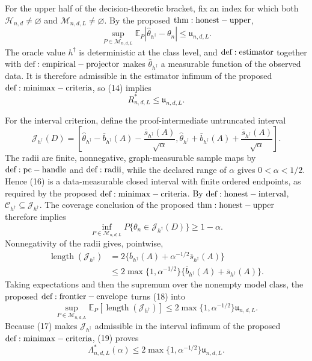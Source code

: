 For the upper half of the decision-theoretic bracket, fix an index for which both \(\mathcal H_{n,d}\ne\varnothing\) and \(\mathcal M_{n,d,L}\ne\varnothing\).  By the proposed \({\rm thm:honest-upper}\),
\[
 \sup_{P\in\mathcal M_{n,d,L}}
 \mathbb E_P|\widehat\theta_{h^\dagger}-\theta_n|
 \leq\mathfrak u_{n,d,L}.
\tag{14}
\]
The oracle value \(h^\dagger\) is deterministic at the class level, and \({\rm def:estimator}\) together with \({\rm def:empirical-projector}\) makes \(\widehat\theta_{h^\dagger}\) a measurable function of the observed data.  It is therefore admissible in the estimator infimum of the proposed \({\rm def:minimax-criteria}\), so (14) implies
\[
 R^*_{n,d,L}\leq\mathfrak u_{n,d,L}.
\tag{15}
\]

For the interval criterion, define the proof-intermediate untruncated interval
\[
 \mathcal J_{h^\dagger}(D)=
 \left[
 \widehat\theta_{h^\dagger}-\overline b_{h^\dagger}(A)
 -\frac{\overline s_{h^\dagger}(A)}{\sqrt\alpha},
 \widehat\theta_{h^\dagger}+\overline b_{h^\dagger}(A)
 +\frac{\overline s_{h^\dagger}(A)}{\sqrt\alpha}
 \right].
\tag{16}
\]
The radii are finite, nonnegative, graph-measurable sample maps by \({\rm def:pc-handle}\) and \({\rm def:radii}\), while the declared range of \(\alpha\) gives \(0<\alpha<1/2\).  Hence (16) is a data-measurable closed interval with finite ordered endpoints, as required by the proposed \({\rm def:minimax-criteria}\).  By \({\rm def:honest-interval}\), \(\mathcal C_{h^\dagger}\subseteq\mathcal J_{h^\dagger}\).  The coverage conclusion of the proposed \({\rm thm:honest-upper}\) therefore implies
\[
 \inf_{P\in\mathcal M_{n,d,L}}
 P\{\theta_n\in\mathcal J_{h^\dagger}(D)\}
 \geq1-\alpha.
\tag{17}
\]
Nonnegativity of the radii gives, pointwise,
\[
\begin{aligned}
 \operatorname{length}(\mathcal J_{h^\dagger})
 &=2\{\overline b_{h^\dagger}(A)
 +\alpha^{-1/2}\overline s_{h^\dagger}(A)\}\\
 &\leq2\max\{1,\alpha^{-1/2}\}
 \{\overline b_{h^\dagger}(A)+\overline s_{h^\dagger}(A)\}.
\end{aligned}
\tag{18}
\]
Taking expectations and then the supremum over the nonempty model class, the proposed \({\rm def:frontier-envelope}\) turns (18) into
\[
 \sup_{P\in\mathcal M_{n,d,L}}
 \mathbb E_P[\operatorname{length}(\mathcal J_{h^\dagger})]
 \leq2\max\{1,\alpha^{-1/2}\}\mathfrak u_{n,d,L}.
\tag{19}
\]
Because (17) makes \(\mathcal J_{h^\dagger}\) admissible in the interval infimum of the proposed \({\rm def:minimax-criteria}\), (19) proves
\[
 \Lambda^*_{n,d,L}(\alpha)
 \leq2\max\{1,\alpha^{-1/2}\}\mathfrak u_{n,d,L}.
\tag{20}
\]

